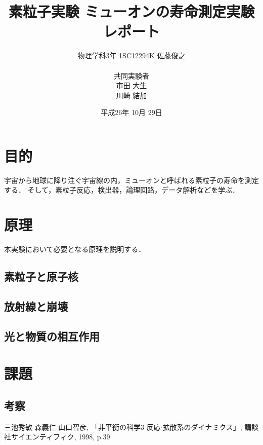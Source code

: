 \documentclass[a4paper,10pt]{jsarticle}
\begin{document}
\title{素粒子実験 ミューオンの寿命測定実験 レポート}
\author{物理学科3年 1SC12294K 佐藤俊之\\\\ 共同実験者\\市田 大生\\川崎 結加}
\date{平成26年 10月 29日}

\maketitle

\section{目的}
宇宙から地球に降り注ぐ宇宙線の内，ミューオンと呼ばれる素粒子の寿命を測定する．
そして，素粒子反応，検出器，論理回路，データ解析などを学ぶ．

\section{原理}
本実験において必要となる原理を説明する．

\subsection{素粒子と原子核}
\subsection{放射線と崩壊}
\subsection{光と物質の相互作用}


\section{課題}

\subsection{考察}



\begin{thebibliography}{2}
   三池秀敏 森義仁 山口智彦, 「非平衡の科学3 反応$\cdot$拡散系のダイナミクス」, 講談社サイエンティフィク, 1998, p.39
\end{thebibliography}
\end{document}
